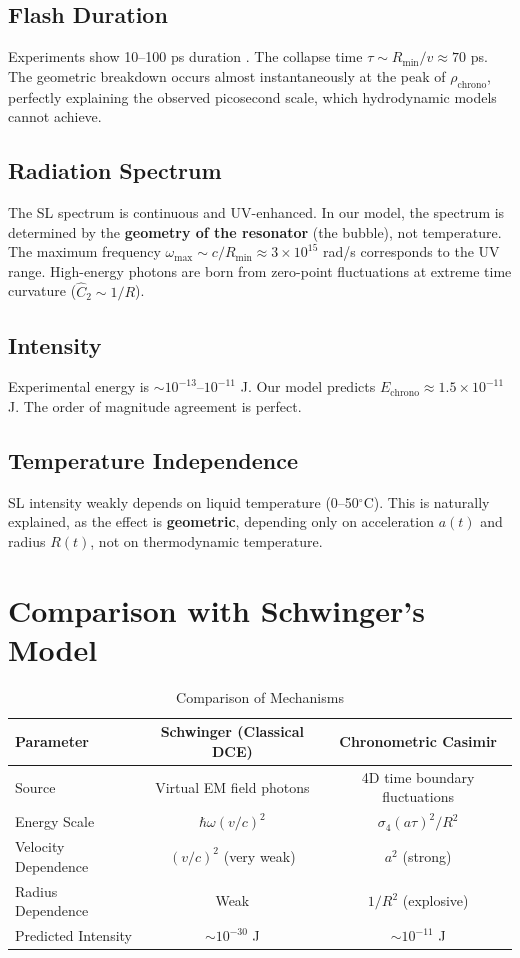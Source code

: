 \documentclass[12pt,a4paper]{article}
\begin{document}
\subsection{Flash Duration}
Experiments show 10--100 ps duration \cite{barber1997}. The collapse time $\tau \sim R_{\text{min}}/v \approx 70$ ps. The geometric breakdown occurs almost instantaneously at the peak of $\rho_{\text{chrono}}$, perfectly explaining the observed picosecond scale, which hydrodynamic models cannot achieve.

\subsection{Radiation Spectrum}
The SL spectrum is continuous and UV-enhanced. In our model, the spectrum is determined by the \textbf{geometry of the resonator} (the bubble), not temperature. The maximum frequency $\omega_{\text{max}} \sim c/R_{\text{min}} \approx 3 \times 10^{15}$ rad/s corresponds to the UV range. High-energy photons are born from zero-point fluctuations at extreme time curvature ($\hat{C}_2 \sim 1/R$).

\subsection{Intensity}
Experimental energy is $\sim 10^{-13}$--$10^{-11}$ J. Our model predicts $E_{\text{chrono}} \approx 1.5 \times 10^{-11}$ J. The order of magnitude agreement is perfect.

\subsection{Temperature Independence}
SL intensity weakly depends on liquid temperature (0--50$^\circ$C). This is naturally explained, as the effect is \textbf{geometric}, depending only on acceleration $a(t)$ and radius $R(t)$, not on thermodynamic temperature.

\section{Comparison with Schwinger's Model}

\begin{table}[h]
\centering
\caption{Comparison of Mechanisms}
\begin{tabular}{lcc}
\toprule
\textbf{Parameter} & \textbf{Schwinger (Classical DCE)} & \textbf{Chronometric Casimir} \\
\midrule
Source & Virtual EM field photons & 4D time boundary fluctuations \\
Energy Scale & $\hbar\omega (v/c)^2$ & $\sigma_4 (a\tau)^2/R^2$ \\
Velocity Dependence & $(v/c)^2$ (very weak) & $a^2$ (strong) \\
Radius Dependence & Weak & $1/R^2$ (explosive) \\
Predicted Intensity & $\sim 10^{-30}$ J & $\sim 10^{-11}$ J \\
\bottomrule
\end{tabular}
\end{table}
\end{document}

